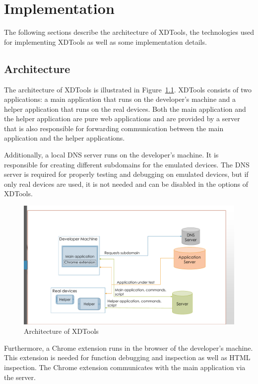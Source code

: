 \chapter{Implementation}

The following sections describe the architecture of XDTools, the technologies used for implementing XDTools as well as some implementation details.

\section{Architecture}

The architecture of XDTools is illustrated in Figure~\ref{fig:architecture}. XDTools consists of two applications: a main application that runs on the developer's machine and a helper application that runs on the real devices. Both the main application and the helper application are pure web applications and are provided by a server that is also responsible for forwarding communication between the main application and the helper applications.

Additionally, a local DNS server runs on the developer's machine. It is responsible for creating different subdomains for the emulated devices. The DNS server is required for properly testing and debugging on emulated devices, but if only real devices are used, it is not needed and can be disabled in the options of XDTools.

\begin{figure}[H]
  \centering
    \includegraphics[width=1.0\textwidth]{images/architecture_2.pdf}
	\caption[Architecture of XDTools]{Architecture of XDTools}
	\label{fig:architecture}
\end{figure}

Furthermore, a Chrome extension runs in the browser of the developer's machine. This extension is needed for function debugging and inspection as well as HTML inspection. The Chrome extension communicates with the main application via the server.

